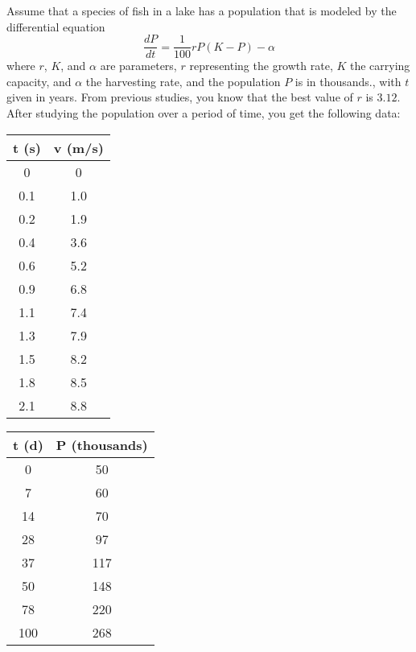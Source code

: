 \documentclass{ximera}
\begin{document}
\begin{exercise}\label{ex:ModelingParamPop}
    Assume that a species of fish in a lake has a population that is modeled by the differential equation
    \begin{equation*}
        \frac{dP}{dt} = \frac{1}{100}rP(K - P) - \alpha 
    \end{equation*}
    where $r$, $K$, and $\alpha$ are parameters, $r$ representing the growth rate, $K$ the carrying capacity, and $\alpha$ the harvesting rate, and the population $P$ is in thousands., with $t$ given in years. From previous studies, you know that the best value of $r$ is $3.12$. After studying the population over a period of time, you get the following data:
    
        \begin{tabular}{|c|c|}\hline
             \textbf{t} (s)& \textbf{v} (m/s)  \\ \hline
            0 & 0 \\
        	0.1 &1.0 \\
        	0.2 &  1.9\\
        	0.4 & 3.6 \\
        	0.6 & 5.2 \\
        	0.9 & 6.8 \\
        	1.1 & 7.4 \\
        	1.3 & 7.9 \\
        	1.5 & 8.2 \\
        	1.8 & 8.5\\
        	2.1 & 8.8  \\ \hline
        \end{tabular}
    
        \begin{tabular}{|c|c|}\hline
             \textbf{t} (d)& \textbf{P} (thousands)  \\ \hline
            0 & 50 \\
           7  & 60 \\
            14 & 70 \\
            28 & 97 \\
            37 & 117 \\
             50 & 148 \\
            78 & 220 \\
            100 & 268
             \\ \hline
        \end{tabular}
    

\end{exercise}
\end{document}

